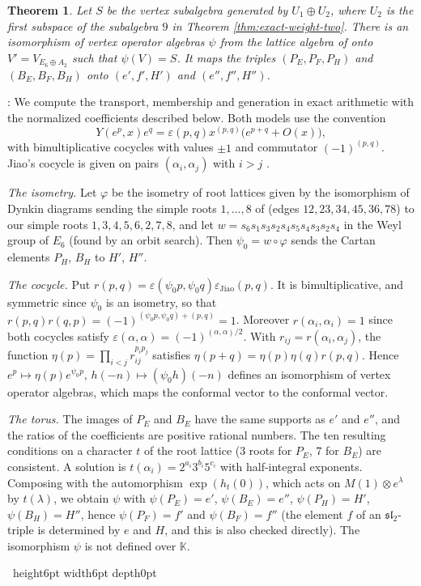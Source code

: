 \documentclass[leqno]{article}
\newcommand{\K}{\ensuremath{\mathbb{K}}}
\newcommand{\qed}{\hfill \vrule height6pt  width6pt depth0pt}
\newcommand{\ot}{\otimes}
\newcommand{\epsi}{\varepsilon}
\newtheorem{thm}{Theorem}[section]
\newenvironment{proof}[1][]{\noindent {\it Proof #1} : }{\hbox{~}\qed
\smallskip
}
\numberwithin{equation}{section}
\begin{document}
\begin{thm}
\label{thm:jiao-identification}
Let $S$ be the vertex subalgebra generated by $U_1 \oplus U_2$, where $U_2$ is the first subspace of the subalgebra $9$ in Theorem \ref{thm:exact-weight-two}. There is an isomorphism of vertex operator algebras $\psi$ from the lattice algebra of \cite{Jia26} onto $V' = V_{E_6 \oplus A_2}$ such that $\psi(V) = S$. It maps the triples $(P_E,P_F,P_H)$ and $(B_E,B_F,B_H)$ onto $(e',f',H')$ and $(e'',f'',H'')$.
\end{thm}

\begin{proof}
We compute the transport, membership and generation in exact arithmetic with the normalized coefficients described below. Both models use the convention
\[
Y(e^p,x)e^q = \epsi(p,q) x^{(p,q)}\big(e^{p+q} + O(x)\big),
\]
with bimultiplicative cocycles with values $\pm 1$ and commutator $(-1)^{(p,q)}$. Jiao's cocycle is given on pairs $(\alpha_i,\alpha_j)$ with $i > j$ \cite[Section 3.1]{Jia26}.

\emph{The isometry.} Let $\varphi$ be the isometry of root lattices given by the isomorphism of Dynkin diagrams sending the simple roots $1,\ldots,8$ of \cite{Jia26} (edges $12, 23, 34, 45, 36, 78$) to our simple roots $1,3,4,5,6,2,7,8$, and let $w = s_6s_1s_3s_2s_4s_5s_4s_3s_2s_4$ in the Weyl group of $E_6$ (found by an orbit search). Then $\psi_0 = w \circ \varphi$ sends the Cartan elements $P_H$, $B_H$ to $H'$, $H''$.

\emph{The cocycle.} Put $r(p,q) = \epsi(\psi_0p,\psi_0q) \epsi_{\mathrm{Jiao}}(p,q)$. It is bimultiplicative, and symmetric since $\psi_0$ is an isometry, so that $r(p,q)r(q,p) = (-1)^{(\psi_0p,\psi_0q)+(p,q)} = 1$. Moreover $r(\alpha_i,\alpha_i) = 1$ since both cocycles satisfy $\epsi(\alpha,\alpha) = (-1)^{(\alpha,\alpha)/2}$. With $r_{ij} = r(\alpha_i,\alpha_j)$, the function $\eta(p) = \prod_{i<j} r_{ij}^{p_ip_j}$ satisfies $\eta(p+q) = \eta(p)\eta(q)r(p,q)$. Hence $e^p \mapsto \eta(p)e^{\psi_0p}$, $h(-n) \mapsto (\psi_0h)(-n)$ defines an isomorphism of vertex operator algebras, which maps the conformal vector to the conformal vector.

\emph{The torus.} The images of $P_E$ and $B_E$ have the same supports as $e'$ and $e''$, and the ratios of the coefficients are positive rational numbers. The ten resulting conditions on a character $t$ of the root lattice ($3$ roots for $P_E$, $7$ for $B_E$) are consistent. A solution is $t(\alpha_i) = 2^{a_i}3^{b_i}5^{c_i}$ with half-integral exponents. Composing with the automorphism $\exp(h_t(0))$, which acts on $M(1) \ot e^\lambda$ by $t(\lambda)$, we obtain $\psi$ with $\psi(P_E) = e'$, $\psi(B_E) = e''$, $\psi(P_H) = H'$, $\psi(B_H) = H''$, hence $\psi(P_F) = f'$ and $\psi(B_F) = f''$ (the element $f$ of an $\mathfrak{sl}_2$-triple is determined by $e$ and $H$, and this is also checked directly). The isomorphism $\psi$ is not defined over $\K$.


\end{proof}
\end{document}
